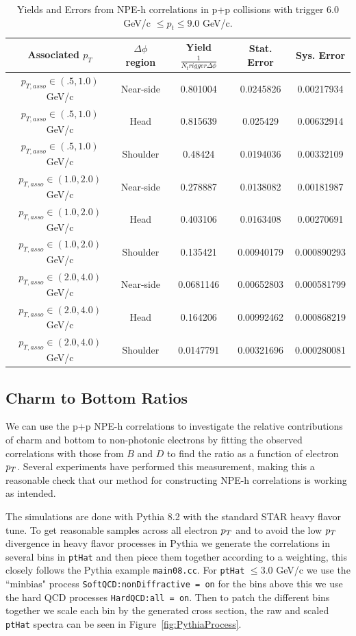 \begin{table}
\centering
\begin{tabular}{|c|c|c|c|c|}
\hline
Associated $p_T$	& $\Delta\phi$ region & Yield $\frac{1}{N_trigger \Delta\phi}$ & Stat. Error & Sys. Error\\
\hline
$p_{T,asso} \in(.5, 1.0)$ GeV/c  & Near-side  & 0.801004 & 0.0245826 & 0.00217934 \\
\hline
$p_{T,asso} \in(.5, 1.0)$ GeV/c  & Head  & 0.815639 & 0.025429 & 0.00632914 \\
\hline
$p_{T,asso} \in(.5, 1.0)$ GeV/c  & Shoulder & 0.48424 & 0.0194036 & 0.00332109 \\
\hline
$p_{T,asso} \in(1.0, 2.0)$ GeV/c  & Near-side & 0.278887 & 0.0138082 & 0.00181987 \\
\hline
$p_{T,asso} \in(1.0, 2.0)$ GeV/c  & Head & 0.403106 & 0.0163408 & 0.00270691 \\
\hline
$p_{T,asso} \in(1.0, 2.0)$ GeV/c  & Shoulder & 0.135421 & 0.00940179 & 0.000890293 \\
\hline
$p_{T,asso} \in(2.0, 4.0)$ GeV/c  & Near-side & 0.0681146 & 0.00652803 & 0.000581799 \\
\hline
$p_{T,asso} \in(2.0, 4.0)$ GeV/c  & Head & 0.164206 & 0.00992462 & 0.000868219 \\
\hline
$p_{T,asso} \in(2.0, 4.0)$ GeV/c  & Shoulder & 0.0147791 & 0.00321696 & 0.000280081 \\
\hline
\end{tabular}
\caption[Yields and Errors in p+p Correlations, High Trigger]{Yields and Errors from NPE-h correlations in p+p collisions with trigger $6.0 $GeV/c $\leq p_t \leq 9.0$ GeV/c.}
\label{tab:ppyieldhigh}
\end{table} 

\subsection{Charm to Bottom Ratios}

We can use the p+p NPE-h correlations to investigate the relative contributions of charm and bottom to non-photonic electrons by fitting the observed correlations with those from $B$ and $D$ to find the ratio as a function of electron $p_{T}$. Several experiments have performed this measurement, making this a reasonable check that our method for constructing NPE-h correlations is working as intended. 

The simulations are done with Pythia 8.2 with the standard STAR heavy flavor tune. To get reasonable samples across all electron $p_{T}$ and to avoid the low $p_{T}$ divergence in heavy flavor processes in Pythia we generate the correlations in several bins in \texttt{ptHat} and then piece them together according to a weighting, this closely follows the Pythia example \texttt{main08.cc}. For \texttt{ptHat} $\leq 3.0$ GeV/c we use the ``minbias" process \texttt{SoftQCD:nonDiffractive = on} for the bins above this we use the hard QCD processes \texttt{HardQCD:all = on}. Then to patch the different bins together we scale each bin by the generated cross section, the raw and scaled \texttt{ptHat} spectra can be seen in Figure~\ref{fig:PythiaProcess}.   

